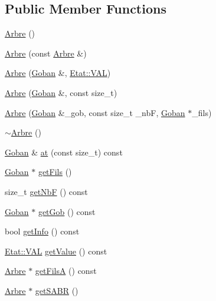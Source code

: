 \subsection*{Public Member Functions}
\begin{DoxyCompactItemize}
\item 
\hyperlink{class_arbre_a761f4a2c6a43f44b38d4ac6fc1cf5cae}{Arbre} ()
\item 
\hyperlink{class_arbre_a3284c47c1ea92a6c5be4a210008dfb4f}{Arbre} (const \hyperlink{class_arbre}{Arbre} \&)
\item 
\hyperlink{class_arbre_ac82e543d8cbf0aced4d741c346f9950d}{Arbre} (\hyperlink{class_goban}{Goban} \&, \hyperlink{class_etat_af3ddb2296ffc379b7f3ad2bf832f294e}{Etat\+::\+V\+AL})
\item 
\hyperlink{class_arbre_acaa1b2ef290ae35e414d6fc5510c9e6e}{Arbre} (\hyperlink{class_goban}{Goban} \&, const size\+\_\+t)
\item 
\hyperlink{class_arbre_a7be58ac146487307f93a5c141f3546df}{Arbre} (\hyperlink{class_goban}{Goban} \&\+\_\+gob, const size\+\_\+t \+\_\+nbF, \hyperlink{class_goban}{Goban} $\ast$\+\_\+fils)
\item 
\hyperlink{class_arbre_ad5f22ec66953891aef2722438fb7c088}{$\sim$\+Arbre} ()
\item 
\hyperlink{class_goban}{Goban} \& \hyperlink{class_arbre_ab8761bfdaadb8d6846199f269c6bbbc4}{at} (const size\+\_\+t) const
\item 
\hyperlink{class_goban}{Goban} $\ast$ \hyperlink{class_arbre_aeb01ee4f7044ba1107237af784c26a26}{get\+Fils} ()
\item 
size\+\_\+t \hyperlink{class_arbre_a0aef1f091d76bca13229a21fcd45a076}{get\+NbF} () const
\item 
\hyperlink{class_goban}{Goban} $\ast$ \hyperlink{class_arbre_ae9d294f541cec5e5fac9ccd8fe8496ee}{get\+Gob} () const
\item 
bool \hyperlink{class_arbre_afc71a182e86352b06193c2dc746fab79}{get\+Info} () const
\item 
\hyperlink{class_etat_af3ddb2296ffc379b7f3ad2bf832f294e}{Etat\+::\+V\+AL} \hyperlink{class_arbre_aeaa93d0b192e3cce04adb509b6b29c40}{get\+Value} () const
\item 
\hyperlink{class_arbre}{Arbre} $\ast$ \hyperlink{class_arbre_af2b7629b3686bcf3e49f737adb3b2d24}{get\+FilsA} () const
\item 
\hyperlink{class_arbre}{Arbre} $\ast$ \hyperlink{class_arbre_afb60b996a0b7225303ff20256483f383}{get\+S\+A\+BR} ()
\item 

\end{DoxyCompactItemize}
